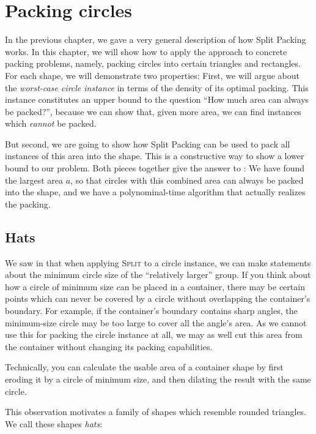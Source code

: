 \documentclass[a4paper,style=print,bibliography=totoc,nexus,lnum,extramargin]{tubsbook}
\begin{document}
\chapter{Packing circles}\label{ch:circles}

In the previous chapter, we gave a very general description of how Split Packing works. In this chapter, we will show how to apply the approach to concrete packing problems, namely, packing circles into certain triangles and rectangles. For each shape, we will demonstrate two properties: First, we will argue about the \emph{worst-case circle instance} in terms of the density of its optimal packing. This instance constitutes an upper bound to the question “How much area can always be packed?”, because we can show that, given more area, we can find instances which \emph{cannot} be packed.

But second, we are going to show how Split Packing can be used to pack all instances of this area into the shape. This is a constructive way to show a lower bound to our problem. Both pieces together give the answer to : We have found the largest area $a$, so that circles with this combined area can always be packed into the shape, and we have a polynominal-time algorithm that actually realizes the packing.

\section{Hats}

We saw in  that when applying \textsc{Split} to a circle instance, we can make statements about the minimum circle size of the “relatively larger” group.
If you think about how a circle of minimum size can be placed in a container, there may be certain points which can never be covered by a circle without overlapping the container's boundary. For example, if the container's boundary contains sharp angles, the minimum-size circle may be too large to cover all the angle's area. As we cannot use this for packing the circle instance at all, we may as well cut this area from the container without changing its packing capabilities.

Technically, you can calculate the usable area of a container shape by first eroding it by a circle of minimum size, and then dilating the result with the same circle.

This observation motivates a family of shapes which resemble rounded triangles. We call these shapes \emph{hats}:
\end{document}
